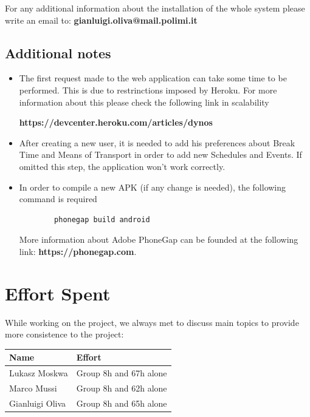 \documentclass[numbers=noenddot, 12pt, a4paper, oneside]{scrbook}
\begin{document}
For any additional information about the installation of the whole system please write an email to: \textbf{gianluigi.oliva@mail.polimi.it} \\\newline

\section*{Additional notes}

\begin{itemize}
	\item The first request made to the web application can take some time to be performed. This is due to restrinctions imposed by Heroku.
	For more information about this please check the following link in scalability
	
	\textbf{https://devcenter.heroku.com/articles/dynos}
	
	\item After creating a new user, it is needed to add his preferences about Break Time and Means of Transport in order to add new Schedules and Events. If omitted this step, the application won't work correctly.
	
	\item In order to compile a new APK (if any change is needed), the following command is required
	\begin{lstlisting}
		phonegap build android
	\end{lstlisting}
	More information about Adobe PhoneGap can be founded at the following link: \textbf{https://phonegap.com}.
	
\end{itemize}


\chapter{Effort Spent}

While working on the project, we always met to discuss main topics to provide more consistence to the project:\\

\begin{tabular}{|p{}|p{}|}
	\hline
	\parbox[c][6ex]{6ex}{\centering \textbf{Name}} & \textbf{Effort}
	\\
	\hline
	\parbox[c][8ex]{6ex}{\centering Lukasz Moskwa} & Group 8h and 67h alone\\
	\hline
	\parbox[c][8ex]{6ex}{\centering Marco Mussi} & Group 8h and 62h alone\\
	\hline
	\parbox[c][8ex]{6ex}{\centering Gianluigi Oliva} & Group 8h and 65h alone \\
	\hline
\end{tabular}
\end{document}
